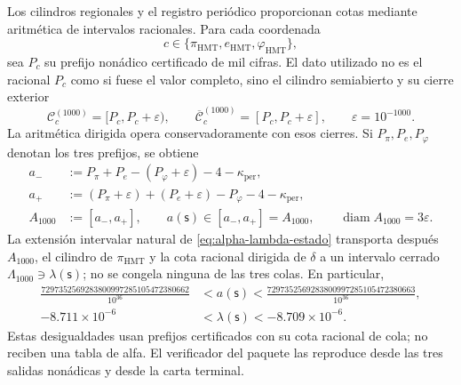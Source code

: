 Los cilindros regionales y el registro periódico proporcionan cotas mediante
aritmética de intervalos racionales. Para cada coordenada
\[
 c\in\{\pi_{\mathrm{HMT}},e_{\mathrm{HMT}},\varphi_{\mathrm{HMT}}\},
\]
sea \(P_c\) su prefijo nonádico certificado de mil cifras. El dato utilizado
no es el racional \(P_c\) como si fuese el valor completo, sino el cilindro
semiabierto y su cierre exterior
\[
 \mathcal C_c^{(1000)}=[P_c,P_c+\varepsilon),
 \qquad
 \overline{\mathcal C}_c^{(1000)}=[P_c,P_c+\varepsilon],
 \qquad \varepsilon=10^{-1000}.
\]
La aritmética dirigida opera conservadoramente con esos cierres. Si
\(P_\pi,P_e,P_\varphi\) denotan los tres prefijos, se obtiene
\begin{equation}
\begin{aligned}
 a_-&:=P_\pi+P_e-(P_\varphi+\varepsilon)-4-
       \kappa_{\mathrm{per}},\\
 a_+&:=(P_\pi+\varepsilon)+(P_e+\varepsilon)-P_\varphi-4-
       \kappa_{\mathrm{per}},\\
 A_{1000}&:=[a_-,a_+],
 \qquad a(\mathsf s)\in[a_-,a_+]=A_{1000},
 \qquad \operatorname{diam}A_{1000}=3\varepsilon.
\end{aligned}
\label{eq:alpha-propagacion-colas-rev08}
\end{equation}
La extensión intervalar natural de
\eqref{eq:alpha-lambda-estado} transporta después \(A_{1000}\), el cilindro
de \(\pi_{\mathrm{HMT}}\) y la cota racional dirigida de \(\delta\) a un
intervalo cerrado \(\Lambda_{1000}\ni\lambda(\mathsf s)\); no se congela
ninguna de las tres colas. En particular,
\begin{equation}
\begin{aligned}
 \frac{7297352569283800997285105472380662}{10^{36}}
 &<a(\mathsf s)<
 \frac{7297352569283800997285105472380663}{10^{36}},\\
 -8.711\mathbin{\times}10^{-6}
 &<\lambda(\mathsf s)<-8.709\mathbin{\times}10^{-6}.
\end{aligned}
 \label{eq:alpha-cotas-precoordenada-lambda}
\end{equation}
Estas desigualdades usan prefijos certificados con su cota racional de
cola; no reciben una tabla de alfa. El verificador del paquete las reproduce
desde las tres salidas nonádicas y desde la carta terminal.


